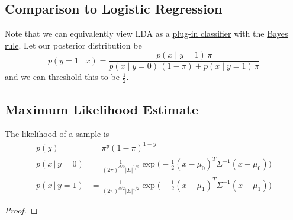 \subsection{Comparison to Logistic Regression}

  Note that we can equivalently view LDA as a \hyperref[def:plug-in-classifier]{plug-in classifier} with the \hyperref[prob-thm:bayes-rule]{Bayes rule}. Let our posterior distribution be 
  \begin{equation}
    p(y = 1 \mid x) = \frac{p(x \mid y = 1) \, \pi}{p(x \mid y = 0) \, (1 - \pi) + p(x \mid y = 1) \, \pi}
  \end{equation}
  and we can threshold this to be $\frac{1}{2}$. 

\subsection{Maximum Likelihood Estimate} 

  \begin{lemma}[Likelihood]
    \label{thm:likelihood}
    The likelihood of a sample is 
    \begin{align}
      p(y) & = \pi^y (1 - \pi)^{1-y} \\
      p(x\,|\,y = 0) & = \frac{1}{(2\pi)^{d/2} |\Sigma|^{1/2}} \exp \bigg(-\frac{1}{2} (x - \mu_0)^T \Sigma^{-1} (x - \mu_0)\bigg) \\
      p(x\,|\,y= 1) & = \frac{1}{(2\pi)^{d/2} |\Sigma|^{1/2}} \exp \bigg(-\frac{1}{2} (x - \mu_1)^T \Sigma^{-1} (x - \mu_1)\bigg)
    \end{align}
  \end{lemma}
  \begin{proof}
    
  \end{proof}

